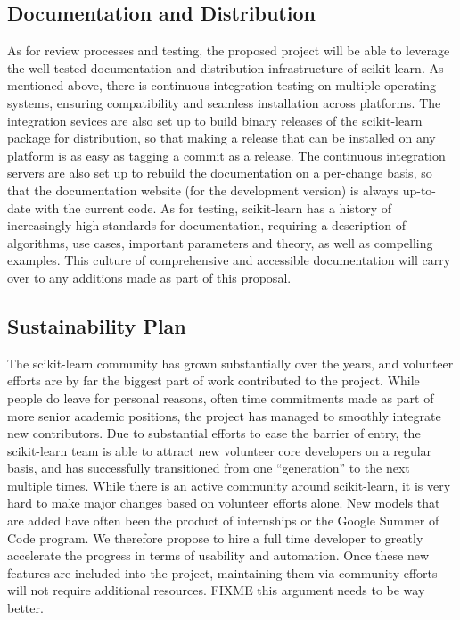 \subsection{Documentation and Distribution}
As for review processes and testing, the proposed project will be able to leverage the
well-tested documentation and distribution infrastructure of scikit-learn.
As mentioned above, there is continuous integration testing on multiple operating systems,
ensuring compatibility and seamless installation across platforms.
The integration sevices are also set up to build binary releases of the scikit-learn package
for distribution, so that making a release that can be installed on any platform is as
easy as tagging a commit as a release.
The continuous integration servers are also set up to rebuild the documentation on a per-change
basis, so that the documentation website (for the development version) is always up-to-date
with the current code.
As for testing, scikit-learn has a history of increasingly high standards for documentation,
requiring a description of algorithms, use cases, important parameters and theory,
as well as compelling examples. This culture of comprehensive and accessible documentation
will carry over to any additions made as part of this proposal.

\subsection{Sustainability Plan}
The scikit-learn community has grown substantially over the years, and volunteer efforts
are by far the biggest part of work contributed to the project.
While people do leave for personal reasons, often time commitments made as part
of more senior academic positions, the project has managed to smoothly integrate new
contributors. Due to substantial efforts to ease the barrier of entry, the scikit-learn
team is able to attract new volunteer core developers on a regular basis, and has
successfully transitioned from one ``generation'' to the next multiple times.
While there is an active community around scikit-learn, it is very hard to make
major changes based on volunteer efforts alone. New models that are added have often
been the product of internships or the Google Summer of Code program.
We therefore propose to hire a full time developer to greatly accelerate the progress
in terms of usability and automation.
Once these new features are included into the project, maintaining them via community
efforts will not require additional resources. FIXME this argument needs to be way better.


